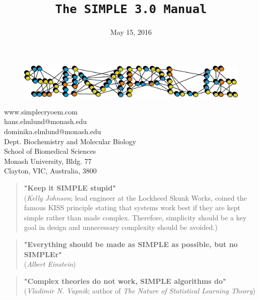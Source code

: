 \documentclass[a4paper,11pt]{article}
\newcommand{\prgname}[1]{\textcolor{NavyBlue}{\texttt{#1}}}
\begin{document}
\begin{figure}
\centering
\includegraphics[keepaspectratio=true,scale=0.6]{./SIMPLE_logo/rawlogo}
\end{figure}

\title{\prgname{The SIMPLE 3.0 Manual}}
\date{May 15, 2016}
\maketitle

\vspace{1em}
\begin{minipage}[ht]{0.48\textwidth}
www.simplecryoem.com\\
hans.elmlund@monash.edu\\
dominika.elmlund@monash.edu\\
Dept. Biochemistry and Molecular Biology\\
School of Biomedical Sciences\\
Monash University, Bldg. 77\\
Clayton, VIC, Australia, 3800\\
\end{minipage}
\vspace{20pt}

\begin{quote}
\textbf{"Keep it SIMPLE stupid"}\\(\textit{Kelly Johnson}; lead engineer at the Lockheed Skunk Works, coined the famous KISS principle stating that systems work best if they are kept simple rather than made complex. Therefore, simplicity should be a key goal in design and unnecessary complexity should be avoided.)
\end{quote}

\begin{quote}
\textbf{"Everything should be made as SIMPLE as possible, but no SIMPLEr"}\\(\textit{Albert Einstein})
\end{quote}

\begin{quote}
\textbf{"Complex theories do not work, SIMPLE algorithms do"}\\(\textit{Vladimir N. Vapnik}; author of \textit{The Nature of Statistical Learning Theory})
\end{quote}
\clearpage
\end{document}
